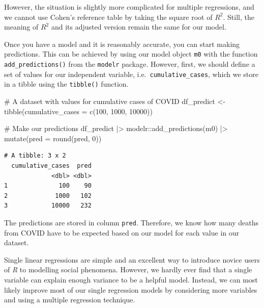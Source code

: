 \documentclass[
  letterpaper,
  DIV=11,
  numbers=noendperiod]{scrreprt}
\newenvironment{Shaded}{\begin{snugshade}}{\end{snugshade}}
\newcommand{\AttributeTok}[1]{\textcolor[rgb]{0.40,0.45,0.13}{#1}}
\newcommand{\CommentTok}[1]{\textcolor[rgb]{0.37,0.37,0.37}{#1}}
\newcommand{\DecValTok}[1]{\textcolor[rgb]{0.68,0.00,0.00}{#1}}
\newcommand{\FunctionTok}[1]{\textcolor[rgb]{0.28,0.35,0.67}{#1}}
\newcommand{\NormalTok}[1]{\textcolor[rgb]{0.00,0.23,0.31}{#1}}
\newcommand{\OtherTok}[1]{\textcolor[rgb]{0.00,0.23,0.31}{#1}}
\newcommand{\SpecialCharTok}[1]{\textcolor[rgb]{0.37,0.37,0.37}{#1}}
\begin{document}
However, the situation is slightly more complicated for multiple
regressions, and we cannot use Cohen's reference table by taking the
square root of \(R^2\). Still, the meaning of \(R^2\) and its adjusted
version remain the same for our model.

Once you have a model and it is reasonably accurate, you can start
making predictions. This can be achieved by using our model object
\texttt{m0} with the function \texttt{add\_predictions()} from the
\texttt{modelr} package. However, first, we should define a set of
values for our independent variable, i.e.~\texttt{cumulative\_cases},
which we store in a tibble using the \texttt{tibble()} function.

\begin{Shaded}
\begin{Highlighting}[]
\CommentTok{\# A dataset with values for cumulative cases of COVID}
\NormalTok{df\_predict }\OtherTok{\textless{}{-}}
  \FunctionTok{tibble}\NormalTok{(}\AttributeTok{cumulative\_cases =} \FunctionTok{c}\NormalTok{(}\DecValTok{100}\NormalTok{, }\DecValTok{1000}\NormalTok{, }\DecValTok{10000}\NormalTok{))}

\CommentTok{\# Make our predictions}
\NormalTok{df\_predict }\SpecialCharTok{|\textgreater{}}
\NormalTok{  modelr}\SpecialCharTok{::}\FunctionTok{add\_predictions}\NormalTok{(m0) }\SpecialCharTok{|\textgreater{}}
  \FunctionTok{mutate}\NormalTok{(}\AttributeTok{pred =} \FunctionTok{round}\NormalTok{(pred, }\DecValTok{0}\NormalTok{))}
\end{Highlighting}
\end{Shaded}

\begin{verbatim}
# A tibble: 3 x 2
  cumulative_cases  pred
             <dbl> <dbl>
1              100    90
2             1000   102
3            10000   232
\end{verbatim}

The predictions are stored in column \texttt{pred}. Therefore, we know
how many deaths from COVID have to be expected based on our model for
each value in our dataset.

Single linear regressions are simple and an excellent way to introduce
novice users of \emph{R} to modelling social phenomena. However, we
hardly ever find that a single variable can explain enough variance to
be a helpful model. Instead, we can most likely improve most of our
single regression models by considering more variables and using a
multiple regression technique.
\end{document}

